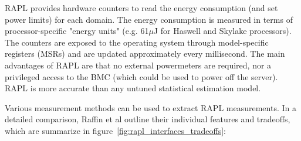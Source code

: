 RAPL provides hardware counters to read the energy consumption (and set power limits) for each domain. The energy consumption is measured in terms of processor-specific "energy units" (e.g. 61$\mu$J for Haswell and Skylake processors). The counters are exposed to the operating system through model-specific registers (MSRs) and are updated approximately every millisecond. The main advantages of RAPL are that no external powermeters are required, nor a privileged access to the BMC (which could be used to power off the server). RAPL is more accurate than any untuned statistical estimation model.

Various measurement methods can be used to extract RAPL measurements. In a detailed comparison, Raffin et al\parencite{raffin2024dissecting} outline their individual features and tradeoffs, which are summarize in figure~\ref{fig:rapl_interfaces_tradeoffs}:
